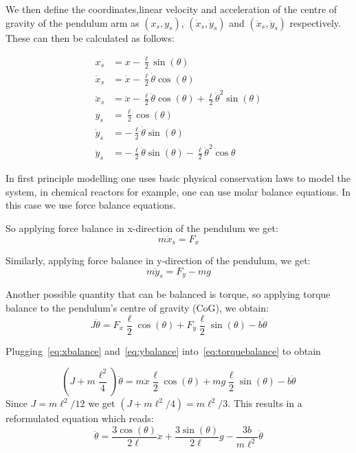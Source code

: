 We then define the coordinates,linear velocity and acceleration of the centre of gravity of the pendulum arm as $(x_s,y_s)$, $(\dot{x}_s, \dot{y}_s)$ and $(\ddot{x}_s,\ddot{y}_s)$ respectively. These can then be calculated as follows:


\begin{align*}
x_s &= x - \frac{\ell}{2} \sin(\theta)\\
\dot{x}_s &= \dot{x} - \frac{\ell}{2}\dot{\theta}\cos(\theta)\\
\ddot{x}_s &= \ddot{x} - \frac{\ell}{2}\ddot{\theta}\cos(\theta) + \frac{\ell}{2}\dot{\theta}^2\sin(\theta)\\
y_s &= \frac{\ell}{2}\cos(\theta)\\
\dot{y}_s &= -\frac{\ell}{2}\dot{\theta}\sin(\theta)\\
\ddot{y}_s &= -\frac{\ell}{2}\ddot{\theta}\sin(\theta)- \frac{\ell}{2}\dot{\theta}^2\cos{\theta}
\end{align*}



In first principle modelling one uses basic physical conservation laws to model the system, in chemical reactors for example, one can use molar balance equations. In this case we use force balance equations.

So applying force balance in x-direction of the pendulum we get:
\begin{equation}\label{eq:xbalance}
m \ddot{x}_s = F_x
\end{equation}

Similarly, applying force balance in y-direction of the pendulum, we get:
\begin{equation}\label{eq:ybalance}
m \ddot{y}_s = F_y - mg
\end{equation}

Another possible quantity that can be balanced is torque, so applying torque balance to the pendulum's centre of gravity (CoG), we obtain:
\begin{equation}\label{eq:torquebalance}
J\ddot{\theta} = F_x \frac{\ell}{2}\cos(\theta) + F_y \frac{\ell}{2}\sin(\theta) - b\dot{\theta}
\end{equation}

Plugging~\eqref{eq:xbalance} and~\eqref{eq:ybalance} into~\eqref{eq:torquebalance} to obtain

\begin{equation}\label{eq: 2.4}
\left(J + m\frac{\ell^2}{4} \right) \ddot{\theta} = m \ddot{x} \frac{\ell}{2}\cos(\theta) + mg \frac{\ell}{2}\sin(\theta) - b\dot{\theta}
\end{equation}
Since $J = m\ell^2 / 12$ we get $(J + m\ell^2/4) = m\ell^2/3$. This results in a reformulated equation which reads:
\begin{equation}
\ddot{\theta} = \frac{3 \cos(\theta)}{2 \ell} \ddot{x} + \frac{3 \sin(\theta)}{2\ell} g - \frac{3b}{m\ell^2} \dot{\theta}
\end{equation}

